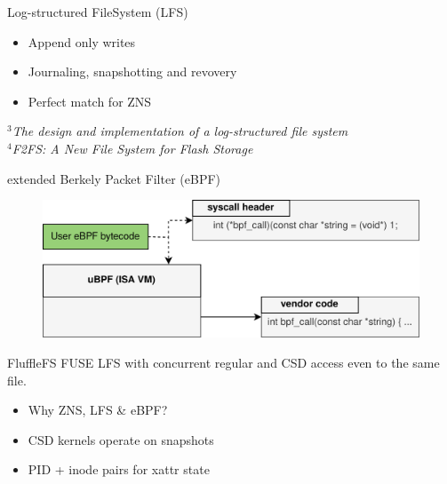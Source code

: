\documentclass{beamer}
\begin{document}
\begin{frame}{Log-structured FileSystem (LFS)}
	\begingroup
	\small
	\begin{itemize}
		\item Append only writes
		\item Journaling, snapshotting and revovery
		\item Perfect match for ZNS
	\end{itemize}
	\textit{\tiny $^{3}$The design and implementation of a log-structured file system \\}
	\textit{\tiny $^{4}$F2FS: A New File System for Flash Storage}
	\endgroup
\end{frame}

\begin{frame}{extended Berkely Packet Filter (eBPF)}
	\begingroup
	\small
	\begin{figure}
		\centering
		\includegraphics[width=1\textwidth]{resources/images/ubpf-simple.png}
	 \end{figure}
	\endgroup
\end{frame}

\begin{frame}{FluffleFS}
	\begingroup
	\small FUSE LFS with concurrent regular and CSD access even to the same file.
	\begin{itemize}
		\item Why ZNS, LFS \& eBPF?
		\item CSD kernels operate on snapshots %
		\item PID + inode pairs for xattr state %
	\end{itemize}
	\endgroup
\end{frame}
\end{document}
